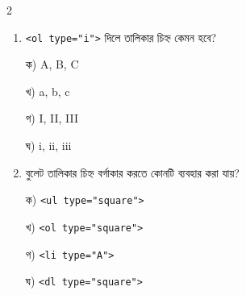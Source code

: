 \begin{multicols}{2}
\begin{enumerate}[leftmargin=*,itemsep=5pt]
\item \begin{minipage}[t]{\linewidth}\vspace{0pt}
\texttt{<ol type="i">} দিলে তালিকার চিহ্ন কেমন হবে?
\par ক) A, B, C
\par খ) a, b, c
\par গ) I, II, III
\par ঘ) i, ii, iii
\end{minipage}

\item \begin{minipage}[t]{\linewidth}\vspace{0pt}
বুলেট তালিকার চিহ্ন বর্গাকার করতে কোনটি ব্যবহার করা যায়?
\par ক) \texttt{<ul type="square">}
\par খ) \texttt{<ol type="square">}
\par গ) \texttt{<li type="A">}
\par ঘ) \texttt{<dl type="square">}
\end{minipage}
\end{enumerate}
\end{multicols}

